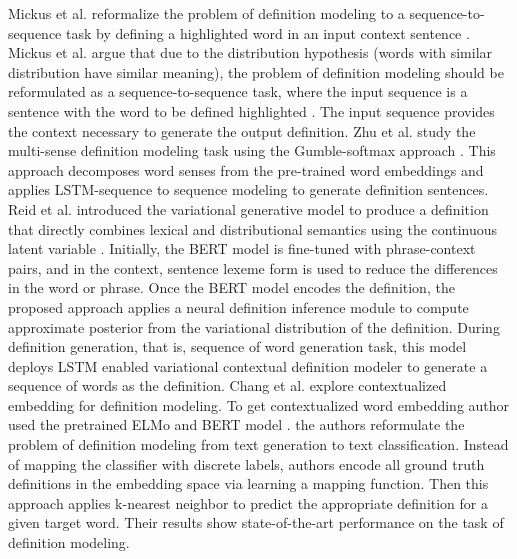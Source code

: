 Mickus et al. reformalize the problem of definition modeling to a
sequence-to-sequence task by defining a highlighted word in an input context
sentence \cite{mickus_mark_2019}. Mickus et al. argue that due to the
distribution hypothesis (words with similar distribution have similar meaning),
the problem of definition modeling should be reformulated as a
sequence-to-sequence task, where the input sequence is a sentence with the word
to be defined highlighted \cite{mickus_mark_2019}. The input sequence provides
the context necessary to generate the output definition. Zhu et al. study the
multi-sense definition modeling task using the Gumble-softmax approach
\cite{zhu_multi_2019}. This approach decomposes word senses from the pre-trained
word embeddings and applies LSTM-sequence to sequence modeling to generate
definition sentences. Reid et al. introduced the variational generative model to
produce a definition that directly combines lexical and distributional semantics
using the continuous latent variable \cite{reid_vcdm_2020}. Initially, the BERT
model is fine-tuned with phrase-context pairs, and in the context, sentence
lexeme form is used to reduce the differences in the word or phrase. Once the
BERT model encodes the definition, the proposed approach applies a neural
definition inference module to compute approximate posterior from the
variational distribution of the definition. During definition generation, that
is, sequence of word generation task, this model deploys LSTM enabled
variational contextual definition modeler to generate a sequence of words as the
definition. Chang et al. explore contextualized embedding for definition
modeling. To get contextualized word embedding author used the pretrained ELMo
and BERT model \cite{chang_what_2019}. the authors reformulate the problem of
definition modeling from text generation to text classification. Instead of
mapping the classifier with discrete labels, authors encode all ground truth
definitions in the embedding space via learning a mapping function. Then this
approach applies k-nearest neighbor to predict the appropriate definition for a
given target word. Their results show state-of-the-art performance on the task
of definition modeling.

